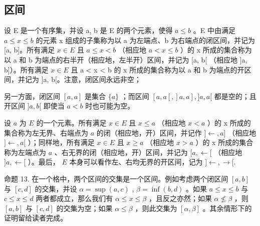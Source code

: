 \subsection{区间}

设 E 是一个有序集，并设 a, b 是 E 的两个元素，使得 \(a \leqslant b\) 。E 中由满足 \(a \leqslant x \leqslant b\) 的元素 x 组成的子集称为以 a 为左端点、b 为右端点的闭区间，并记为 {[}a, b{]}。所有满足 \(x \in E\) 且 \(a \leqslant x < b\) （相应地 \(a < x \leqslant b\) ）的 x 所成的集合称为以 a 和 b 为端点的右半开（相应地，左半开）区间，并记为 {[}a, b{[} （相应地 {]}a, b{]}）。所有满足 \(x \in E\) 且 a \textless{} x \textless{} b 的 x 所成的集合称为以 a 和 b 为端点的开区间，并记为 {]}a, b{[}。注意，闭区间永远非空；

另一方面，闭区间 \([a, a]\) 是集合 \(\{a\}\) ；而区间 \([a, a[, ]a, a], ]a, a[\) 都是空的；且开区间 \(]a, b[\) 即使当 \(a < b\) 时也可能为空。

设 \(a\) 为 \(E\) 的一个元素。所有满足 \(x \in E\) 且 \(x \leqslant a\) （相应地 \(x < a\) ）的 x 所成的集合称为左无界、右端点为 \(a\) 的闭（相应地，开）区间，并记作 \(] \leftarrow, a]\) （相应地 \(] \leftarrow, a[\) ）；同样地，所有满足 \(x \in E\) 且 \(x \geqslant a\) （相应地 \(x > a\) ）的 x 所成的集合称为左端点为 \(a\) 、右无界的闭（相应地，开）区间，并记为 \([a, \leftarrow[\) （相应地 \(]a, \leftarrow[\) ）。最后， \(E\) 本身可以看作左、右均无界的开区间，记为 \(] \leftarrow, \rightarrow [.\)

命题 13. 在一个格中，两个区间的交集是一个区间。例如考虑两个闭区间 \([a, b]\) 与 \([c, d]\) 的交集，并设 \(\alpha = \sup (a, c)\) , \(\beta = \inf (b, d)\) 。如果 \(a \leqslant x \leqslant b\) 与 \(c \leqslant x \leqslant d\) 两者都成立，那么我们有 \(\alpha \leqslant x \leqslant \beta\) ，且反之亦然；如果 \(\alpha \not\leqslant \beta\) ，则 \([a, b]\) 与 \([c, d]\) 的交集为空；如果 \(\alpha \leqslant \beta\) ，则此交集为 \([\alpha, \beta]\) 。其余情形下的证明留给读者完成。

